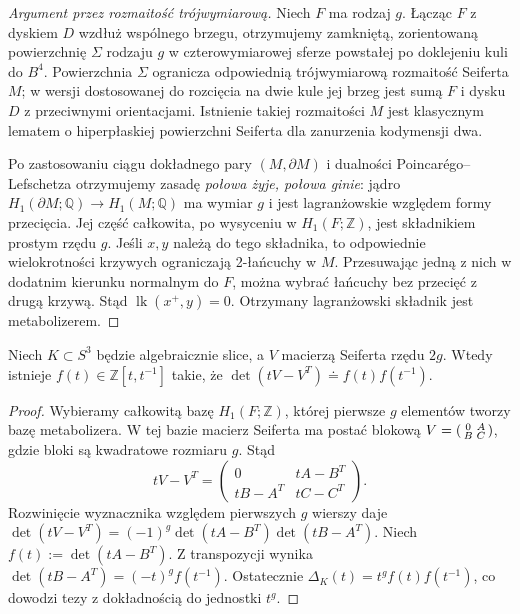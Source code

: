 \begin{proof}[Argument przez rozmaitość trójwymiarową]
Niech $F$ ma rodzaj $g$. Łącząc $F$ z dyskiem $D$
wzdłuż wspólnego brzegu, otrzymujemy zamkniętą,
zorientowaną powierzchnię $\Sigma$ rodzaju $g$ w
czterowymiarowej sferze powstałej po doklejeniu kuli
do $B^4$. Powierzchnia $\Sigma$ ogranicza
odpowiednią trójwymiarową rozmaitość Seiferta $M$;
w wersji dostosowanej do rozcięcia na dwie kule jej
brzeg jest sumą $F$ i dysku $D$ z przeciwnymi orientacjami.
Istnienie takiej rozmaitości $M$ jest klasycznym
lematem o hiperpłaskiej powierzchni Seiferta dla
zanurzenia kodymensji dwa.

Po zastosowaniu ciągu dokładnego pary $(M,\partial M)$
i dualności Poincarégo--Lefschetza otrzymujemy zasadę
\emph{połowa żyje, połowa ginie}: jądro
$H_1(\partial M;\mathbb Q)\to H_1(M;\mathbb Q)$
ma wymiar $g$ i jest lagranżowskie względem
formy przecięcia. Jej część całkowita, po wysyceniu
w $H_1(F;\mathbb Z)$, jest składnikiem prostym rzędu $g$.
Jeśli $x,y$ należą do tego składnika, to odpowiednie
wielokrotności krzywych ograniczają 2-łańcuchy w $M$.
Przesuwając jedną z nich w dodatnim kierunku normalnym
do $F$, można wybrać łańcuchy bez przecięć z drugą krzywą.
Stąd $\operatorname{lk}(x^+,y)=0$.
Otrzymany lagranżowski składnik jest metabolizerem.
\end{proof}

\begin{stwierdzenie}
Niech $K\subset S^3$ będzie algebraicznie slice,
a $V$ macierzą Seiferta rzędu $2g$.
Wtedy istnieje $f(t)\in\mathbb Z[t,t^{-1}]$ takie, że
$\det(tV-V^T)\doteq f(t)f(t^{-1})$.
\end{stwierdzenie}

\begin{proof}
Wybieramy całkowitą bazę $H_1(F;\mathbb Z)$,
której pierwsze $g$ elementów tworzy bazę metabolizera.
W tej bazie macierz Seiferta ma postać blokową
$V=\begin{psmallmatrix}0&A\\B&C\end{psmallmatrix}$,
gdzie bloki są kwadratowe rozmiaru $g$.
Stąd
\[
tV-V^T=\begin{pmatrix}
0&tA-B^T\\tB-A^T&tC-C^T
\end{pmatrix}.
\]
Rozwinięcie wyznacznika względem pierwszych $g$ wierszy
daje
$\det(tV-V^T)=(-1)^g\det(tA-B^T)\det(tB-A^T)$.
Niech $f(t):=\det(tA-B^T)$. Z transpozycji wynika
$\det(tB-A^T)=(-t)^g f(t^{-1})$.
Ostatecznie
$\Delta_K(t)=t^g f(t)f(t^{-1})$,
co dowodzi tezy z dokładnością do jednostki $t^g$.
\end{proof}

